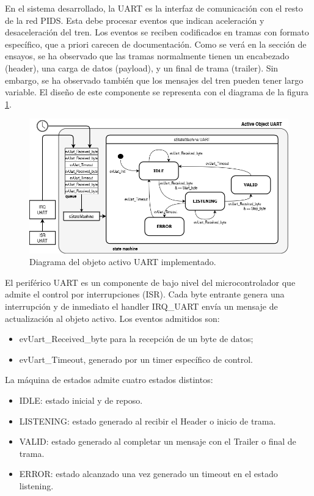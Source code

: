 En el sistema desarrollado, la UART es la interfaz de comunicación con el resto de la red PIDS. Esta debe procesar eventos que indican aceleración y desaceleración del tren. Los eventos se reciben codificados en tramas con formato específico, que a priori carecen de documentación. Como se verá en la sección de ensayos, se ha observado que las tramas normalmente tienen un encabezado (header), una carga de datos (payload), y un final de trama (trailer). Sin embargo, se ha observado también que los mensajes del tren pueden tener largo variable. El diseño de este componente se representa con el diagrama de la figura \ref{fig:diagfsmUART}.\\


\begin{figure}[ht]
	\centering
	\includegraphics[width=1\textwidth]{./Figures/fsmUART3.png}
	\caption{Diagrama del objeto activo UART implementado.}
	\label{fig:diagfsmUART}
\end{figure}

El periférico UART es un componente de bajo nivel del microcontrolador que admite el control por interrupciones (ISR). Cada byte entrante genera una interrupción y de inmediato el handler IRQ\_UART envía un mensaje de actualización al objeto activo. Los eventos admitidos son:
\begin{itemize}
\item evUart\_Received\_byte para la recepción de un byte de datos; 
\item evUart\_Timeout, generado por un timer específico de control.\\
\end{itemize} 

La máquina de estados admite cuatro estados distintos:
\begin{itemize}
\item IDLE: estado inicial y de reposo.
\item LISTENING: estado generado al recibir el Header o inicio de trama.
\item VALID: estado generado al completar un mensaje con el Trailer o final de trama.
\item ERROR: estado alcanzado una vez generado un timeout en el estado listening.
\end{itemize}

